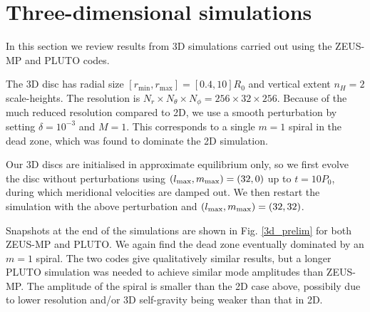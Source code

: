 \section{Three-dimensional simulations}
In this section we review results from 3D simulations carried
out using the ZEUS-MP and PLUTO codes. 


The 3D disc has radial size 
$[r_\mathrm{min},r_\mathrm{max}]=[0.4,10]R_0$ and vertical extent
$n_H=2$ scale-heights. The resolution is $N_r\times N_\theta\times
N_\phi=256\times32\times256$. Because of the much reduced resolution
compared to 2D, we use a smooth perturbation by setting
$\delta = 10^{-3}$ and $M=1$. This corresponds to a single $m=1$
spiral in the dead zone, which was found to dominate the 2D
simulation. 

Our 3D discs are initialised in approximate equilibrium only, so we
first evolve the disc without perturbations using  
$(l_\mathrm{max},m_\mathrm{max})=(32,0)$ up to $t=10P_0$, during which 
meridional velocities are damped out. We then restart the simulation
with the above perturbation and $(l_\mathrm{max},m_\mathrm{max})=(32,32)$. 

Snapshots at the end of the simulations are shown in
Fig. \ref{3d_prelim} for both ZEUS-MP and PLUTO. We again find the dead zone eventually
dominated by an $m=1$ spiral.%
The two codes give qualitatively similar results, but a longer PLUTO simulation was
needed to achieve similar mode amplitudes than ZEUS-MP. 
The amplitude of the spiral is smaller than the 2D case above,
possibily due to lower resolution and/or 3D self-gravity being weaker
than that in 2D.  

